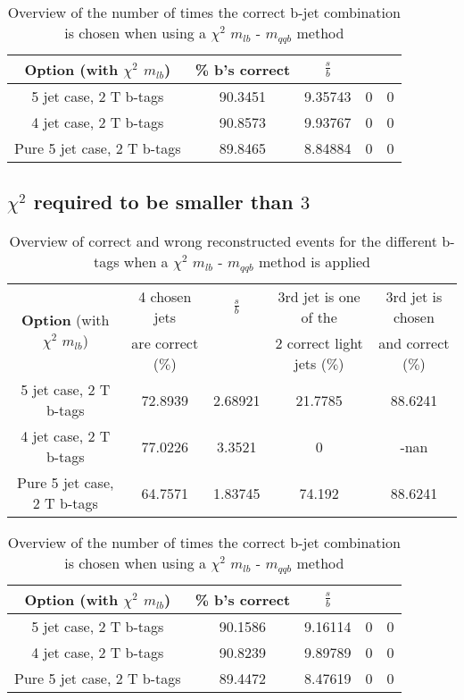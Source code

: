 \documentclass[a4paper,12pt]{report}
\begin{document}
 \begin{table}[!h] 
 \begin{tabular}{c|c|c|c|c} 
 \textbf{Option} (with $\chi^{2}$ $m_{lb}$) & \% b's correct   & $\frac{s}{b}$ &  &  \\ \hline 
 5 jet case,      2 T b-tags              & 90.3451 & 9.35743 & 0 & 0 \\ 
 4 jet case,      2 T b-tags              & 90.8573 & 9.93767 & 0 & 0 \\ 
 Pure 5 jet case, 2 T b-tags              & 89.8465 & 8.84884 & 0 & 0 \\ 
 \end{tabular} 
 \caption{Overview of the number of times the correct b-jet combination is chosen when using a $\chi^{2}$ $m_{lb}$ - $m_{qqb}$ method} 
 \end{table} 
 
 \subsection{$\chi^{2}$ required to be smaller than $3$}
 \begin{table}[!h] 
 \begin{tabular}{c|c|c|c|c} 
\multirow{2}{*}{\textbf{Option} (with $\chi^{2}$ $m_{lb}$)} & 4 chosen jets & $\frac{s}{b}$ & 3rd jet is one of the & 3rd jet is chosen \\ & are correct ($\%$)    & 	             & 2 correct light jets ($\%$) &  and correct ($\%$)	  \\ \hline 
 5 jet case,      2 T b-tags              & 72.8939 & 2.68921 & 21.7785 & 88.6241 \\ 
 4 jet case,      2 T b-tags              & 77.0226 & 3.3521 & 0 & -nan \\ 
 Pure 5 jet case, 2 T b-tags              & 64.7571 & 1.83745 & 74.192 & 88.6241 \\ 
 \end{tabular} 
 \caption{Overview of correct and wrong reconstructed events for the different b-tags when a $\chi^{2}$ $m_{lb}$ - $m_{qqb}$ method is applied} 
 \end{table} 
 
 \begin{table}[!h] 
 \begin{tabular}{c|c|c|c|c} 
 \textbf{Option} (with $\chi^{2}$ $m_{lb}$) & \% b's correct   & $\frac{s}{b}$ &  &  \\ \hline 
 5 jet case,      2 T b-tags              & 90.1586 & 9.16114 & 0 & 0 \\ 
 4 jet case,      2 T b-tags              & 90.8239 & 9.89789 & 0 & 0 \\ 
 Pure 5 jet case, 2 T b-tags              & 89.4472 & 8.47619 & 0 & 0 \\ 
 \end{tabular} 
 \caption{Overview of the number of times the correct b-jet combination is chosen when using a $\chi^{2}$ $m_{lb}$ - $m_{qqb}$ method} 
 \end{table} 
 
\end{document}
